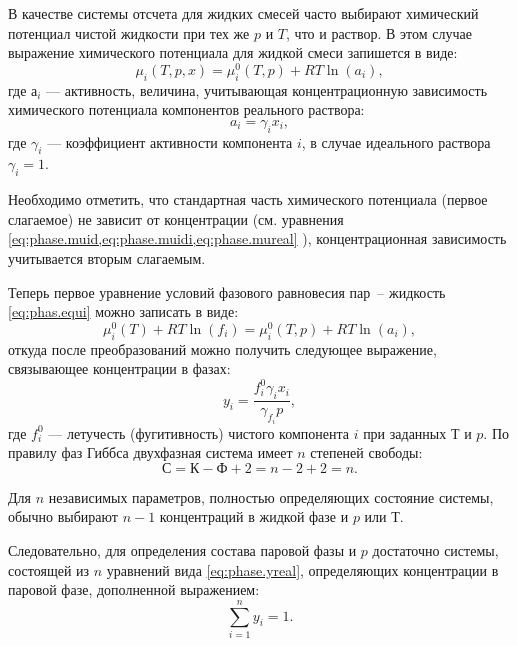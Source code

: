 В качестве системы отсчета для жидких смесей часто выбирают химический потенциал чистой жидкости  при тех же $p$ и $T$, что и раствор. В этом случае выражение химического потенциала для жидкой смеси запишется в виде:
\begin{equation}
	\mu_i(T,p,x)=\mu_i^0(T,p)+R T \ln (a_i),
\end{equation}
где $а_i$ --- активность, величина, учитывающая концентрационную зависимость химического потенциала компонентов реального раствора:
\begin{equation}
	a_i=\gamma_i x_i,
\end{equation}
где $\gamma_i$ --- коэффициент активности компонента $i$, в случае идеального раствора $\gamma_i =1 $.

Необходимо отметить, что стандартная часть химического потенциала (первое слагаемое) не зависит от концентрации (см. уравнения \cref{eq:phase.muid,eq:phase.muidi,eq:phase.mureal} ), концентрационная зависимость учитывается вторым слагаемым.

Теперь первое уравнение условий фазового равновесия пар~-- жидкость \eqref{eq:phas.equi} можно записать в виде:
\begin{equation}
	\mu_i^0(T)+RT \ln (f_i)=\mu_i^0(T,p)+ R T \ln (a_i),
\end{equation}
откуда после преобразований можно получить следующее выражение, связывающее концентрации в фазах:
\begin{equation} \label{eq:phase.yreal}
	y_i=\dfrac{f_i^0 \gamma_i x_i}{\gamma_{f_i} p},
\end{equation}
где $f_i^0$ --- летучесть (фугитивность) чистого компонента $i$ при заданных $Т$ и $p$. 
По правилу фаз Гиббса двухфазная система имеет $n$ степеней свободы:
\begin{equation*}
	С=К-Ф+2=n-2+2=n.
\end{equation*}

Для $n$ независимых параметров, полностью определяющих состояние системы, обычно выбирают $n-1$ концентраций в жидкой фазе и $p$ или $Т$.

Следовательно, для определения состава паровой	 фазы и $p$ достаточно системы, состоящей из $n$ уравнений вида \eqref{eq:phase.yreal}, определяющих концентрации в паровой фазе, дополненной выражением:
\begin{equation}
	\sum\limits_{i=1}^{n} y_i =1.
\end{equation}

